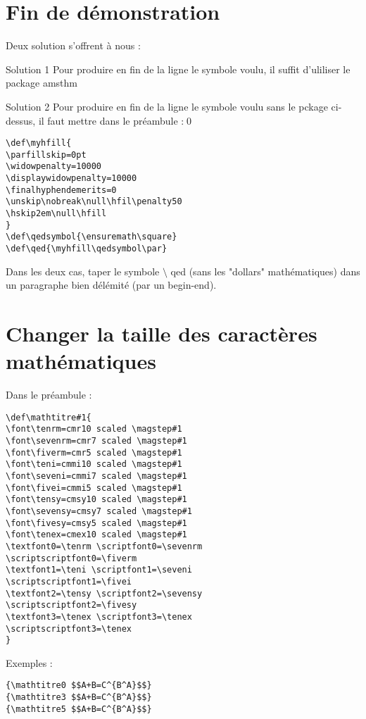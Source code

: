 \documentclass[12pt,french,oneside]{report}
\begin{document}
\begin{spacing}{1.2}
\section{Fin de démonstration}

Deux solution s'offrent à nous : 

\begin{moyen}{Solution 1}
Pour produire en fin de la ligne le symbole voulu, il suffit d'uliliser le package amsthm 
\end{moyen}

\begin{moyen}{Solution 2}
Pour produire en fin de la ligne le symbole voulu sans le pckage ci-dessus, il faut mettre dans le préambule :\qed 
\end{moyen}
%
\begin{verbatim}
\def\myhfill{
\parfillskip=0pt
\widowpenalty=10000
\displaywidowpenalty=10000
\finalhyphendemerits=0
\unskip\nobreak\null\hfil\penalty50
\hskip2em\null\hfill
}
\def\qedsymbol{\ensuremath\square}
\def\qed{\myhfill\qedsymbol\par}
\end{verbatim}

Dans les deux cas, taper le symbole $\setminus$ qed (sans les "dollars" mathématiques) dans un paragraphe bien délémité (par un begin-end).

\section{Changer la taille des caractères mathématiques}

Dans le préambule : 

\begin{verbatim}
\def\mathtitre#1{
\font\tenrm=cmr10 scaled \magstep#1
\font\sevenrm=cmr7 scaled \magstep#1
\font\fiverm=cmr5 scaled \magstep#1
\font\teni=cmmi10 scaled \magstep#1
\font\seveni=cmmi7 scaled \magstep#1
\font\fivei=cmmi5 scaled \magstep#1
\font\tensy=cmsy10 scaled \magstep#1
\font\sevensy=cmsy7 scaled \magstep#1
\font\fivesy=cmsy5 scaled \magstep#1
\font\tenex=cmex10 scaled \magstep#1
\textfont0=\tenrm \scriptfont0=\sevenrm
\scriptscriptfont0=\fiverm
\textfont1=\teni \scriptfont1=\seveni
\scriptscriptfont1=\fivei
\textfont2=\tensy \scriptfont2=\sevensy
\scriptscriptfont2=\fivesy
\textfont3=\tenex \scriptfont3=\tenex
\scriptscriptfont3=\tenex
}
\end{verbatim}

Exemples : 

\begin{verbatim}
{\mathtitre0 $$A+B=C^{B^A}$$}
{\mathtitre3 $$A+B=C^{B^A}$$}
{\mathtitre5 $$A+B=C^{B^A}$$}
\end{verbatim}


\end{spacing}
\end{document}
